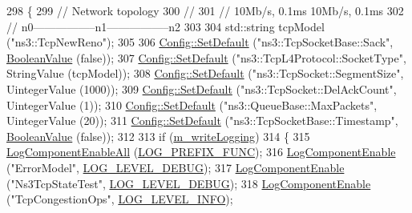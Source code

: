 \begin{DoxyCode}
298 \{
299   \textcolor{comment}{// Network topology}
300   \textcolor{comment}{//}
301   \textcolor{comment}{//           10Mb/s, 0.1ms      10Mb/s, 0.1ms}
302   \textcolor{comment}{//       n0-----------------n1-----------------n2}
303 
304   std::string tcpModel (\textcolor{stringliteral}{"ns3::TcpNewReno"});
305 
306   \hyperlink{group__config_ga2e7882df849d8ba4aaad31c934c40c06}{Config::SetDefault} (\textcolor{stringliteral}{"ns3::TcpSocketBase::Sack"}, \hyperlink{classns3_1_1BooleanValue}{BooleanValue} (\textcolor{keyword}{false}));
307   \hyperlink{group__config_ga2e7882df849d8ba4aaad31c934c40c06}{Config::SetDefault} (\textcolor{stringliteral}{"ns3::TcpL4Protocol::SocketType"}, StringValue (tcpModel));
308   \hyperlink{group__config_ga2e7882df849d8ba4aaad31c934c40c06}{Config::SetDefault} (\textcolor{stringliteral}{"ns3::TcpSocket::SegmentSize"}, UintegerValue (1000));
309   \hyperlink{group__config_ga2e7882df849d8ba4aaad31c934c40c06}{Config::SetDefault} (\textcolor{stringliteral}{"ns3::TcpSocket::DelAckCount"}, UintegerValue (1));
310   \hyperlink{group__config_ga2e7882df849d8ba4aaad31c934c40c06}{Config::SetDefault} (\textcolor{stringliteral}{"ns3::QueueBase::MaxPackets"}, UintegerValue (20));
311   \hyperlink{group__config_ga2e7882df849d8ba4aaad31c934c40c06}{Config::SetDefault} (\textcolor{stringliteral}{"ns3::TcpSocketBase::Timestamp"}, 
      \hyperlink{classns3_1_1BooleanValue}{BooleanValue} (\textcolor{keyword}{false}));
312 
313   \textcolor{keywordflow}{if} (\hyperlink{classNs3TcpStateTestCase_a738c5da39e4cbbbfdc5f789675c9405a}{m\_writeLogging})
314     \{
315       \hyperlink{namespacens3_aef610a7dcaaa6c20499283526b538582}{LogComponentEnableAll} (\hyperlink{namespacens3_aa6464a4d69551a9cc968e17a65f39bdba0dd332264f60317e9a365095e80037d1}{LOG\_PREFIX\_FUNC});
316       \hyperlink{namespacens3_adc4ef4f00bb2f5f4edae67fc3bc27f20}{LogComponentEnable} (\textcolor{stringliteral}{"ErrorModel"}, \hyperlink{namespacens3_aa6464a4d69551a9cc968e17a65f39bdbabc85ae851e992c4d8577705c712061ef}{LOG\_LEVEL\_DEBUG});
317       \hyperlink{namespacens3_adc4ef4f00bb2f5f4edae67fc3bc27f20}{LogComponentEnable} (\textcolor{stringliteral}{"Ns3TcpStateTest"}, \hyperlink{namespacens3_aa6464a4d69551a9cc968e17a65f39bdbabc85ae851e992c4d8577705c712061ef}{LOG\_LEVEL\_DEBUG});
318       \hyperlink{namespacens3_adc4ef4f00bb2f5f4edae67fc3bc27f20}{LogComponentEnable} (\textcolor{stringliteral}{"TcpCongestionOps"}, \hyperlink{namespacens3_aa6464a4d69551a9cc968e17a65f39bdbae36aedc880de94fd5a5b53bb9fe65628}{LOG\_LEVEL\_INFO});

\end{DoxyCode}
